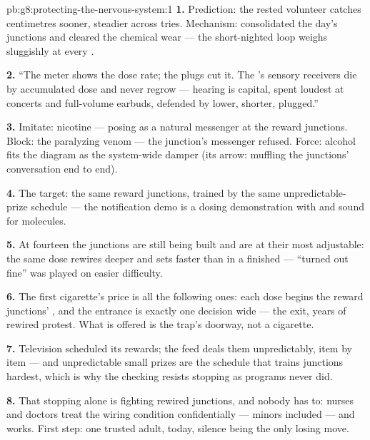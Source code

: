 \begin{solution}{pb:g8:protecting-the-nervous-system:1}
\textbf{1.} Prediction: the rested volunteer catches
centimetres sooner, steadier across tries. Mechanism:
 consolidated the day's junctions and cleared the
chemical wear --- the short-nighted loop weighs sluggishly
at every .

\textbf{2.} ``The meter shows the dose rate; the plugs cut
it. The 's sensory receivers die by accumulated dose
and never regrow --- hearing is capital, spent loudest at
concerts and full-volume earbuds, defended by lower,
shorter, plugged.''

\textbf{3.} Imitate: nicotine --- posing as a natural
messenger at the reward junctions. Block: the paralyzing
venom --- the  junction's messenger refused. Force:
alcohol fits the diagram as the system-wide damper (its
arrow: muffling the junctions' conversation end to end).

\textbf{4.} The target: the same reward junctions, trained
by the same unpredictable-prize schedule --- the
notification demo is a dosing demonstration with  and
sound for molecules.

\textbf{5.} At fourteen the junctions are still being
built and are at their most adjustable: the same dose
rewires deeper and sets faster than in a finished 
--- ``turned out fine'' was played on easier difficulty.

\textbf{6.} The first cigarette's price is all the
following ones: each dose begins the reward junctions'
, and the entrance is exactly one decision wide
--- the exit, years of rewired protest. What is offered is
the trap's doorway, not a cigarette.

\textbf{7.} Television scheduled its rewards; the feed
deals them unpredictably, item by item --- and
unpredictable small prizes are the schedule that trains
junctions hardest, which is why the checking resists
stopping as programs never did.

\textbf{8.} That stopping alone is fighting rewired
junctions, and nobody has to: nurses and doctors treat
the wiring condition confidentially --- minors included
--- and  works. First step: one trusted
adult, today, silence being the only losing move.


\end{solution}

